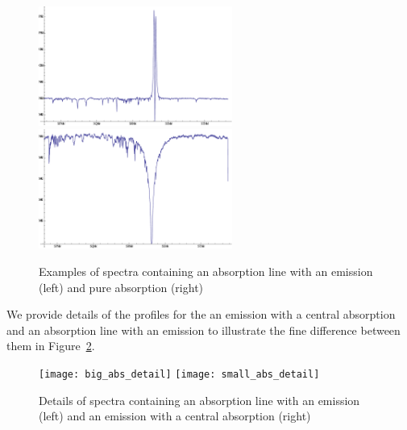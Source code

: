\documentclass[thesis=B,english]{FITthesis}[2012/10/20]
\begin{document}
\begin{figure}
\centering
\includegraphics[width=180pt]{big_abs_spectrum}
\label{fig:large_abs}
\centering
\includegraphics[width=180pt]{absorbtion_spectrum}
\caption[Examples of spectra containing an absorption line with an emission (shell line) and a pure absorption]{Examples of spectra containing an absorption line with an emission (left) and pure absorption (right)}
\label{fig:pure_absrob}
\end{figure}
We provide details of the profiles for the an emission with a central absorption and an absorption line with an emission to illustrate the fine difference between them in Figure~\ref{fig:detail}.
\begin{figure}
\centering
\texttt{[image: big\_abs\_detail]}
\label{fig:large_abs}
\centering
\texttt{[image: small\_abs\_detail]}
\caption[Details of spectra containing an absorption line with an emission (shell line) and an emission with a central absorption]{Details of spectra containing an absorption line with an emission (left) and an emission with a central absorption (right)}
\label{fig:detail}
\end{figure}
\end{document}
